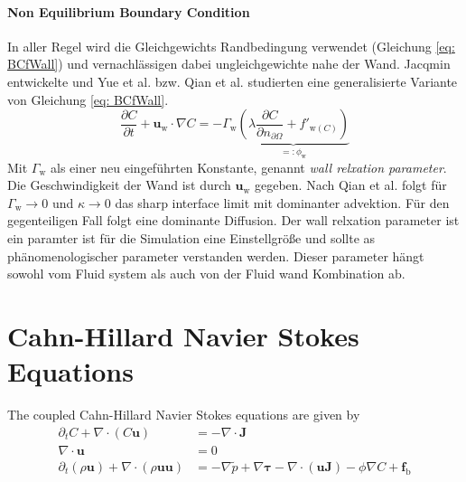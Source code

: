 \paragraph{Non Equilibrium Boundary Condition}
\label{sec: nonEquiBC}
In aller Regel wird die Gleichgewichts Randbedingung verwendet (Gleichung \ref{eq: BCfWall}) und vernachlässigen dabei ungleichgewichte nahe der Wand. Jacqmin \cite{jacqmin2000ContactlineDynamicsDiffuse} entwickelte und Yue et al. \cite{yue2011WallEnergyRelaxation} bzw. Qian et al. \cite{qian2006VariationalApproachMoving} studierten eine generalisierte Variante von Gleichung \ref{eq: BCfWall}.
\begin{equation}
    \frac{\partial C}{\partial t} + \mathbf{u}_{\mathrm{w}}\cdot \nabla C = -\Gamma_{\mathrm{w}} \underbrace{\left(\lambda \frac{\partial C}{\partial n_{\partial \Omega}}+f'_{\mathrm{w}(C)}\right)}_{=:\phi_{\mathrm{w}}}
\end{equation}
Mit $\Gamma_{\mathrm{w}}$ als einer neu eingeführten Konstante, genannt \textit{wall relxation parameter}. Die Geschwindigkeit der Wand ist durch $\mathbf{u}_{\mathrm{w}}$ gegeben. Nach Qian et al. \cite{qian2006VariationalApproachMoving} folgt für $\Gamma_{\mathrm{w}}\rightarrow 0$ und $\kappa\rightarrow 0$ das sharp interface limit mit dominanter advektion. Für den gegenteiligen Fall folgt eine dominante Diffusion. Der wall relxation parameter ist ein paramter ist für die Simulation eine Einstellgröße und sollte as phänomenologischer parameter verstanden werden. Dieser parameter hängt sowohl vom Fluid system als auch von der Fluid wand Kombination ab\cite{jacqmin2000ContactlineDynamicsDiffuse}.

\section{Cahn-Hillard Navier Stokes Equations}
The coupled Cahn-Hillard Navier Stokes equations are given by
\begin{align}
    \partial_t C + \nabla \cdot \left( C \mathbf{u} \right) &= -\nabla \cdot \mathbf{J} \\
    \nabla \cdot \mathbf{u} &= 0 \\
    \label{eq: NSEChanged}
    \partial_t(\rho \mathbf{u}) + \nabla \cdot (\rho \mathbf{u}\mathbf{u})&= -\nabla \tilde{p} + \nabla \mathbf{\tau} - \nabla \cdot(\mathbf{u}\mathbf{J})-\phi\nabla C + \mathbf{f}_{\mathrm{b}}
\end{align}

